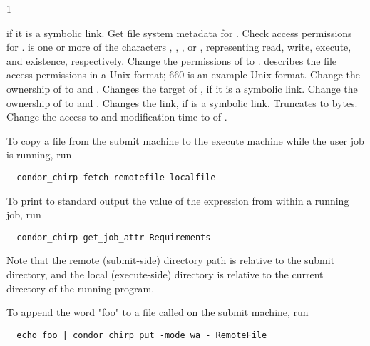 \begin{ManPage}{\label{man-condor-chirp}}{1}
\begin{description}
{    if it is a symbolic link.}
    {Get file system metadata for .}
    {Check access permissions for . 
     is one or more of the characters , , 
    , or , representing read, write, execute, and 
    existence, respectively.}
    {Change the permissions of  to .
     describes the file access permissions in a Unix format;
    660 is an example Unix format. }
    {Change the ownership of  to  and .
    Changes the target of , if it is a symbolic link.}
    {Change the ownership of  to  and .
    Changes the link, if  is a symbolic link.}
    {Truncates  to  bytes.}
    {Change the access to  and modification time
    to  of .}
\end{description}

\Examples

To copy a file from the submit machine to the execute machine while the 
user job is running, run

\footnotesize
\begin{verbatim}
  condor_chirp fetch remotefile localfile
\end{verbatim}
\normalsize

To print to standard output the value of the 
expression from within a running job, run

\footnotesize
\begin{verbatim}
  condor_chirp get_job_attr Requirements
\end{verbatim}
\normalsize

Note that the remote (submit-side) directory path is relative to the
submit directory, and the local (execute-side) directory is relative to the
current directory of the running program.

To append the word "foo" to a file called  
on the submit machine, run

\footnotesize
\begin{verbatim}
  echo foo | condor_chirp put -mode wa - RemoteFile
\end{verbatim}
\normalsize


\end{ManPage}
